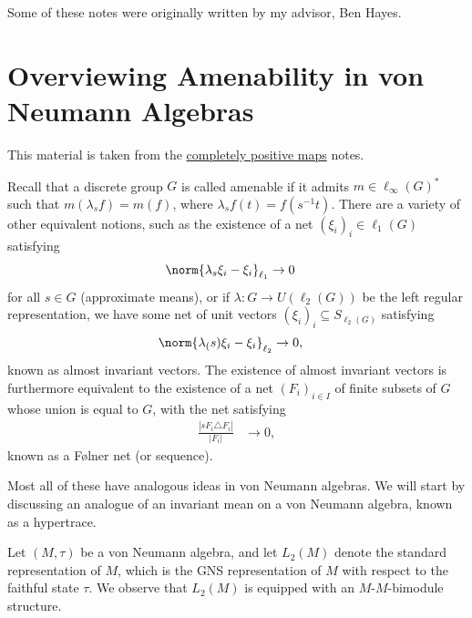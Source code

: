 \documentclass[10pt]{mypackage}
\begin{document}
\RaggedRight
Some of these notes were originally written by my advisor, Ben Hayes.
\section{Overviewing Amenability in von Neumann Algebras}%
This material is taken from the \href{https://ai-bearing.github.io/Classes_and_Homework/After\%20College/Other\%20Notes/completely_positive_maps.pdf}{completely positive maps} notes.

Recall that a discrete group $G$ is called amenable if it admits $m\in \ell_{\infty}\left( G \right)^{\ast}$ such that $m\left( \lambda_s f \right) = m(f)$, where $\lambda_sf(t) = f\left( s^{-1} t\right)$. There are a variety of other equivalent notions, such as the existence of a net $\left( \xi_i \right)_{i}\in \ell_1\left( G \right)$ satisfying
\begin{align*}
  \norm{\lambda_s\xi_i - \xi_i}_{\ell_1} &\rightarrow 0
\end{align*}
for all $s\in G$ (approximate means), or if $\lambda\colon G\rightarrow U\left( \ell_2\left( G \right) \right)$ be the left regular representation, we have some net of unit vectors $\left( \xi_i \right)_{i}\subseteq S_{\ell_2(G)}$ satisfying
\begin{align*}
  \norm{\lambda_(s)\xi_i-\xi_i}_{\ell_2} &\rightarrow 0,
\end{align*}
known as almost invariant vectors. The existence of almost invariant vectors is furthermore equivalent to the existence of a net $\left( F_i \right)_{i\in I}$ of finite subsets of $G$ whose union is equal to $G$, with the net satisfying
\begin{align*}
  \frac{\left\vert sF_i\triangle F_i \right\vert}{\left\vert F_i \right\vert} &\rightarrow 0,
\end{align*}
known as a Følner net (or sequence).

Most all of these have analogous ideas in von Neumann algebras. We will start by discussing an analogue of an invariant mean on a von Neumann algebra, known as a hypertrace.

Let $\left( M,\tau \right)$ be a von Neumann algebra, and let $L_2\left( M \right)$ denote the standard representation of $M$, which is the GNS representation of $M$ with respect to the faithful state $\tau$. We observe that $L_2\left( M \right)$ is equipped with an $M$-$M$-bimodule structure.
\end{document}
